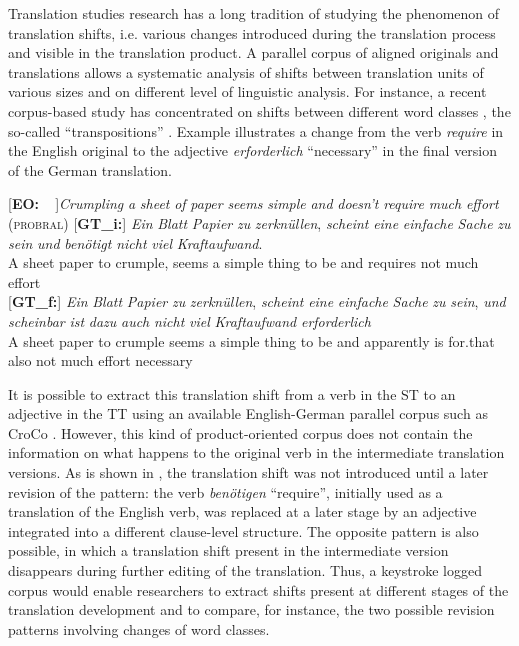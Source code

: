 \documentclass[output=paper]{LSP/langsci}
\begin{document}
Translation studies research has a long tradition of studying the phenomenon of translation shifts, i.e. various changes introduced during the translation process and visible in the translation product. A parallel corpus of aligned originals and translations allows a systematic analysis of shifts between translation units of various sizes and on different level of linguistic analysis. For instance, a recent corpus-based study has concentrated on shifts between different word classes \citep{Culo2008}, the so-called “transpositions” \citep[36]{Vinay1995/1958}. Example  illustrates a change from the verb \textit{require} in the English original to the adjective \textit{erforderlich} “necessary” in the final version of the German translation. 

\ea \label{ex:1:8}
\begin{xlist}
\exi{}[\textbf{EO:~~}]{\emph{Crumpling} \emph{a} \emph{sheet} \emph{of} \emph{paper} \emph{seems} \emph{simple} \emph{and} \emph{doesn't} \emph{require} \emph{much} \emph{effort} (\textsc{probral})}
\exi{}[\textbf{GT\_i:}]{
\gll \emph{Ein} \emph{Blatt} \emph{Papier} \emph{zu} \emph{zerknüllen}, \emph{scheint} \emph{eine} \emph{einfache} \emph{Sache} \emph{zu} \emph{sein} \emph{und} \emph{benötigt} \emph{nicht} \emph{viel} \emph{Kraftaufwand}.\\
  A sheet paper to crumple, seems a simple thing to be and requires not much effort\\
}
\exi{}[\textbf{GT\_f:}]{
\gll \emph{Ein}   \emph{Blatt} \emph{Papier} \emph{zu} \emph{zerknüllen}, \emph{scheint} \emph{eine} \emph{einfache} \emph{Sache} \emph{zu} \emph{sein}, \emph{und} \emph{scheinbar} \emph{ist} \emph{dazu} \emph{auch} \emph{nicht} \emph{viel} \emph{Kraftaufwand} \emph{erforderlich}\\
A sheet paper to crumple seems a simple thing to be and apparently is for.that also not much effort necessary\\
}
\end{xlist}
\z

It is possible to extract this translation shift from a verb in the ST to an adjective in the TT using an available English-German parallel corpus such as CroCo \citep{Hansen-Schirra2012}. However, this kind of product-oriented corpus does not contain the information on what happens to the original verb in the intermediate translation versions. As is shown in , the translation shift was not introduced until a later revision of the pattern: the verb \textit{benötigen} “require”, initially used as a translation of the English verb, was replaced at a later stage by an adjective integrated into a different clause-level structure. The opposite pattern is also possible, in which a translation shift present in the intermediate version disappears during further editing of the translation. Thus, a keystroke logged corpus would enable researchers to extract shifts present at different stages of the translation development and to compare, for instance, the two possible revision patterns involving changes of word classes.
  
\end{document}
